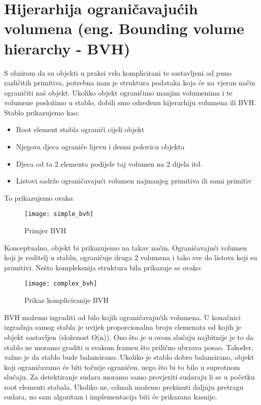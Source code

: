 \chapter{Hijerarhija ograničavajućih volumena (eng. Bounding volume hierarchy - BVH)}\label{cha:BVH}
S obzirom da su objekti u praksi vrlo komplicirani te sastavljeni od puno različitih primitiva, potrebna nam je struktura podataka koja će na vjeran način ograničiti naš objekt. Ukoliko objekt ograničimo manjim volumenima i te volumene posložimo u stablo, dobili smo određenu hijerarhiju volumena ili BVH. Stablo prikazujemo kao:
\begin{itemize}
	\item Root element stabla ograniči cijeli objekt
	\item Njegova djeca ograniče lijevu i desnu polovicu objekta
	\item Djeca od ta 2 elementa podijele taj volumen na 2 dijela itd.
	\item Listovi sadrže ograničavajući volumen najmanjeg primitiva ili sami primitiv
\end{itemize}
To prikazujemo ovako:
\newpage
\begin{figure}[!http]
		\begin{center}
			\texttt{[image: simple\_bvh]}
			\caption{Primjer BVH\cite{4}}
			\label{fig:6}
		\end{center}
\end{figure}
Konceptualno, objekt bi prikazujemo na takav način. Ograničavajući volumen koji je roditelj u stablu, ograničuje druga 2 volumena i tako sve do listova koji su primitivi. Nešto kompleksnija struktura bila prikazuje se ovako:
\begin{figure}[!http]
	\begin{center}
		\texttt{[image: complex\_bvh]}
		\caption{Prikaz kompliciranije BVH \cite{4}}
		\label{fig:7}
	\end{center}
	\end{figure}
BVH možemo izgraditi od bilo kojih ograničavajućih volumena. U konačnici izgradnja samog stabla je uvijek proporcionalna broju elemenata od kojih je objekt sastavljen (složenost O(n))\cite{1}. Ono što je u ovom slučaju najbitnije je to da stablo ne moramo graditi u svakom frameu što prilično ubrzava posao. Također, važno je da stablo bude balansirano. Ukoliko je stablo dobro balansirano, objekt koji ograničavamo će biti točnije ograničen, nego što bi to bilo u suprotnom slučaju. Za detektiranje sudara moramo samo provjeriti sudaraju li se u početku root elementi stabala. Ukoliko ne, odmah možemo prekinuti daljnju pretragu sudara, no sam algoritam i implementacija biti će prikazana kasnije.
	
